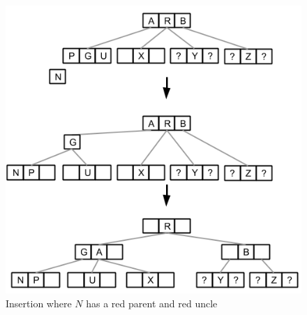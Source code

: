 \documentclass[12pt]{article}
\begin{document}
\begin{enumerate}
\begin{enumerate}
\begin{figure}[h!]
      \includegraphics[scale=0.5]{pics/red_black_tree/ins_rpar_runc_234}
      \caption{Insertion where $N$ has a red parent and red uncle}
    \end{figure}

  \end{enumerate}
\end{enumerate}

\end{document}
